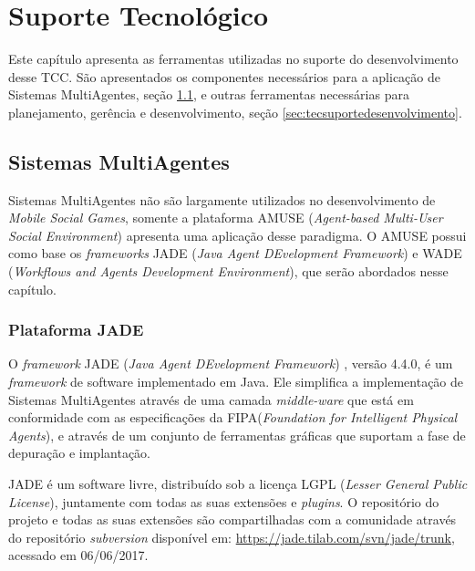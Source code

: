 \chapter{Suporte Tecnológico}

Este capítulo apresenta as ferramentas utilizadas no suporte do desenvolvimento
desse TCC. São apresentados os componentes necessários para a aplicação de
Sistemas MultiAgentes, seção \ref{sec:tecmultiagentes}, e outras ferramentas
necessárias para planejamento, gerência e desenvolvimento, seção
\ref{sec:tecsuportedesenvolvimento}.

\section{Sistemas MultiAgentes}
\label{sec:tecmultiagentes}

Sistemas MultiAgentes não são largamente utilizados no desenvolvimento de
\textit{Mobile Social Games}, somente a plataforma AMUSE (\textit{Agent-based
Multi-User Social Environment}) apresenta uma aplicação desse paradigma. O AMUSE
possui como base os \textit{frameworks} JADE (\textit{Java Agent DEvelopment
Framework}) e WADE (\textit{Workflows and Agents Development Environment}), que
serão abordados nesse capítulo.

    \subsection{Plataforma JADE}

O \textit{framework} JADE (\textit{Java Agent DEvelopment Framework})
\cite{jade}, versão 4.4.0, é um \textit{framework} de software implementado em
Java. Ele simplifica a implementação de Sistemas MultiAgentes através de uma
camada \textit{middle-ware} que está em conformidade com as especificações da
FIPA(\textit{Foundation for Intelligent Physical Agents}), e através de um
conjunto de ferramentas gráficas que suportam a fase de depuração e implantação.

JADE é um software livre, distribuído sob a licença LGPL (\textit{Lesser General
Public License}), juntamente com todas as suas extensões e \textit{plugins}. O
repositório do projeto e todas as suas extensões são compartilhadas com a
comunidade através do repositório \textit{subversion} disponível em:
\url{https://jade.tilab.com/svn/jade/trunk}, acessado em 06/06/2017.

